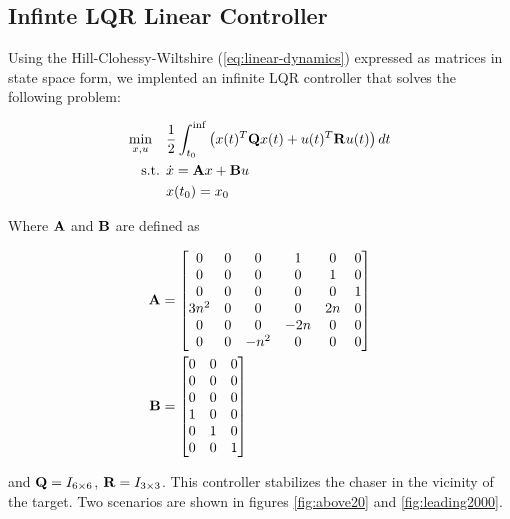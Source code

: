 \documentclass[conference]{IEEEtran}
\begin{document}

\subsection{Infinte LQR Linear Controller}

Using the Hill-Clohessy-Wiltshire (\ref{eq:linear-dynamics})
expressed as matrices in state space form, we
implented an infinite LQR controller that solves the following problem:

\begin{equation}
    \label{eq:linear-infinite-lqr}
    \begin{split}
        \min_{x, u} \ \ \  & \frac{1}{2} \int_{t_0}^{\inf} \left( x(t)^T {\bf Q}
            x(t) + u(t)^T {\bf R} u(t) \right)dt \\
        \text{s.t.   } & \dot{x} = {\bf{A}}x + {\bf B}u \\
                     & x(t_0) = x_0
    \end{split}
\end{equation}

Where ${\bf A}$ and ${\bf B}$ are defined as


\begin{equation}
    \label{eq:linearized-state-space}
    \begin{aligned}
        {\bf A} & = \mat{
            0 & 0 & 0 & 1 & 0 & 0 \\
            0 & 0 & 0 & 0 & 1 & 0 \\
            0 & 0 & 0 & 0 & 0 & 1 \\
            3n^2 & 0 & 0 & 0 & 2n & 0 \\
            0 & 0 & 0 & -2n & 0 & 0 \\
            0 & 0 & -n^2 & 0 & 0 & 0 \\
        } \\
        {\bf B} & = \mat{
            0 & 0 & 0 \\
            0 & 0 & 0 \\
            0 & 0 & 0 \\
            1 & 0 & 0 \\
            0 & 1 & 0 \\
            0 & 0 & 1 \\
        }
    \end{aligned}
\end{equation}

and ${\bf Q} = I_{6\times 6}$, ${\bf R} = I_{3\times 3}$. This controller 
stabilizes the chaser in the vicinity of the target. Two scenarios are shown in 
figures \ref{fig:above20} and \ref{fig:leading2000}.
\end{document}

